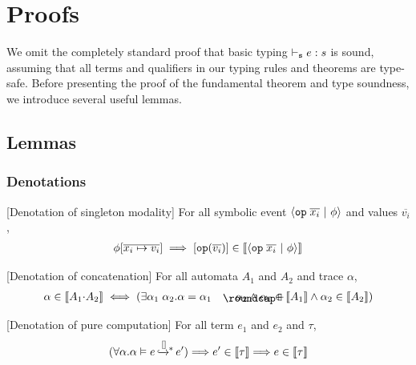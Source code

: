 \newpage
\section{Proofs}\label{sec:tech:proof}

We omit the completely standard proof that basic typing
\(\vdash_{{\tt s}} e : s\) is sound, assuming that all terms and qualifiers
in our typing rules and theorems are type-safe. Before presenting the
proof of the fundamental theorem and type soundness, we introduce
several useful lemmas.

\subsection{Lemmas}

\subsubsection{Denotations}

\begin{lemma}\label{lemma:lastA-denot}[Denotation of singleton modality] For all symbolic event ${\langle} {\boldsymbol{{\tt op}}\;{\overline{x_i}} ~|~ {\phi}} {\rangle}$ and values $\overline{v_i}$,
{\small\begin{align*}
    \phi[\overline{{x_i}\mapsto {v_i}}] \implies
    [\boldsymbol{{\tt op}}({\overline{v_i}})] \in \llbracket {  {\langle} {\boldsymbol{{\tt op}}\;{\overline{x_i}} ~|~ {\phi}}  {\rangle} } \rrbracket
\end{align*}}
\end{lemma}

\begin{lemma}\label{lemma:seqA-denot}[Denotation of concatenation] For all automata $A_1$ and $A_2$ and trace $\alpha$,
{\small\begin{align*}
    \alpha \in \denot{A_1 \seqA A_2} \iff (\exists \alpha_1\;\alpha_2. \alpha = \alpha_1 \listconcat \alpha_2 \land \alpha_1 \in \denot{A_1} \land \alpha_2 \in \denot{A_2})
\end{align*}}
\end{lemma}


\begin{lemma}\label{lemma:pure-denot}[Denotation of pure computation] For all term $e_1$ and $e_2$ and \PAT $\tau$,
{\small\begin{align*}
    (\forall \alpha. {\alpha}\vDash{e}{\,\xhookrightarrow{[]}\,\hspace{-5pt}^*\,}{e'}) {\implies}
   e'\in \llbracket {\tau} \rrbracket {\implies} e \in \llbracket {\tau} \rrbracket
\end{align*}}
\end{lemma}

